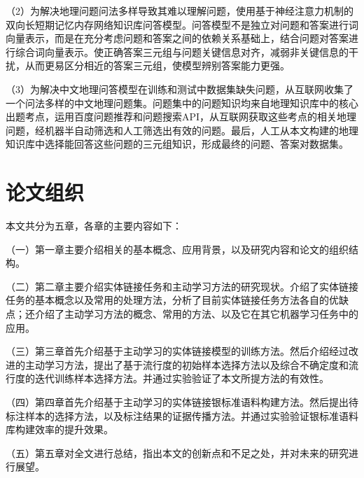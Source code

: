（2）为解决地理问题问法多样导致其难以理解问题，使用基于神经注意力机制的双向长短期记忆内存网络知识库问答模型。问答模型不是独立对问题和答案进行词向量表示，而是在充分考虑问题和答案之间的依赖关系基础上，结合问题对答案进行综合词向量表示。使正确答案三元组与问题关键信息对齐，减弱非关键信息的干扰，从而更易区分相近的答案三元组，使模型辨别答案能力更强。

（3）为解决中文地理问答模型在训练和测试中数据集缺失问题，从互联网收集了一个问法多样的中文地理问题集。问题集中的问题知识均来自地理知识库中的核心出题考点，运用百度问题推荐和问题搜索API，从互联网获取这些考点的相关地理问题，经机器半自动筛选和人工筛选出有效的问题。最后，人工从本文构建的地理知识库中选择能回答这些问题的三元组知识，形成最终的问题、答案对数据集。

\section{论文组织}
本文共分为五章，各章的主要内容如下：

（一）第一章主要介绍相关的基本概念、应用背景，以及研究内容和论文的组织结构。

（二）第二章主要介绍实体链接任务和主动学习方法的研究现状。介绍了实体链接任务的基本概念以及常用的处理方法，分析了目前实体链接任务方法各自的优缺点；还介绍了主动学习方法的概念、常用的方法、以及它在其它机器学习任务中的应用。

（三）第三章首先介绍基于主动学习的实体链接模型的训练方法。然后介绍经过改进的主动学习方法，提出了基于流行度的初始样本选择方法以及综合不确定度和流行度的迭代训练样本选择方法。并通过实验验证了本文所提方法的有效性。

（四）第四章首先介绍基于主动学习的实体链接银标准语料构建方法。然后提出待标注样本的选择方法，以及标注结果的证据传播方法。并通过实验验证银标准语料库构建效率的提升效果。

（五）第五章对全文进行总结，指出本文的创新点和不足之处，并对未来的研究进行展望。